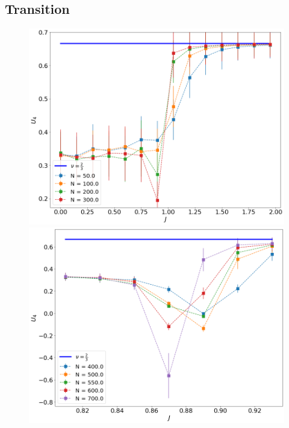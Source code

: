 \subsection{Transition}

 \begin{figure}[H]
	\centering
	\includegraphics[scale=0.23]{Images/3_bindercumulants_shortchains.png} 	\includegraphics[scale=0.23]{Images/3_bindercumulants_longchains.png} \\ 

\end{figure}
